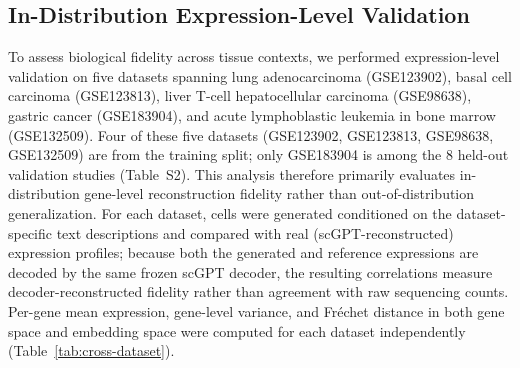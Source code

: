 \documentclass[biology,article,submit,pdftex,moreauthors]{Definitions/mdpi}
\begin{document}
\subsection{In-Distribution Expression-Level Validation}\label{sec:cross-dataset}

To assess biological fidelity across tissue contexts, we performed expression-level validation on five datasets spanning lung adenocarcinoma (GSE123902), basal cell carcinoma (GSE123813), liver T-cell hepatocellular carcinoma (GSE98638), gastric cancer (GSE183904), and acute lymphoblastic leukemia in bone marrow (GSE132509). Four of these five datasets (GSE123902, GSE123813, GSE98638, GSE132509) are from the training split; only GSE183904 is among the 8 held-out validation studies (Table~S2). This analysis therefore primarily evaluates in-distribution gene-level reconstruction fidelity rather than out-of-distribution generalization. For each dataset, cells were generated conditioned on the dataset-specific text descriptions and compared with real (scGPT-reconstructed) expression profiles; because both the generated and reference expressions are decoded by the same frozen scGPT decoder, the resulting correlations measure decoder-reconstructed fidelity rather than agreement with raw sequencing counts. Per-gene mean expression, gene-level variance, and Fr\'{e}chet distance in both gene space and embedding space were computed for each dataset independently (Table~\ref{tab:cross-dataset}).
\end{document}
